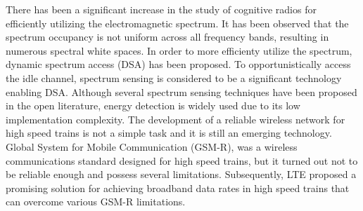 There has been a significant increase in the study of cognitive radios for efficiently utilizing the electromagnetic spectrum. It has been observed that the spectrum occupancy is not uniform across all frequency bands, resulting in numerous spectral white spaces. In order to more efficienty utilize the spectrum, dynamic spectrum access (DSA) has been proposed. To opportunistically access the idle channel, spectrum sensing is considered to be a significant technology enabling DSA. Although several spectrum sensing techniques have been proposed in the open literature, energy detection is widely used due to its low implementation complexity. The development of a reliable wireless network for high speed trains is not a simple task and it is still an emerging technology. Global System for Mobile Communication (GSM-R), was a wireless communications standard designed for high speed trains, but it turned out not to be reliable enough and possess several limitations. Subsequently, LTE proposed a promising solution for achieving broadband data rates in high speed trains that can overcome various GSM-R limitations.
